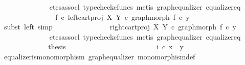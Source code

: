 \begin{isabellebody}
\ \ \ \ \ \ \ \ \ \ \ \ \isamarkupfalse%
\ {\isacharparenleft}{\kern0pt}etcs{\isacharunderscore}{\kern0pt}assocl{\isacharcomma}{\kern0pt}\ typecheck{\isacharunderscore}{\kern0pt}cfuncs{\isacharcomma}{\kern0pt}\ metis\ graph{\isacharunderscore}{\kern0pt}equalizer\ equalizer{\isacharunderscore}{\kern0pt}eq{\isacharparenright}{\kern0pt}\isanewline
\ \ \ \ \ \ \ \ \ \ \isamarkupfalse%
\ \isamarkupfalse%
\ {\isachardoublequoteopen}{\isachardot}{\kern0pt}{\isachardot}{\kern0pt}{\isachardot}{\kern0pt}\ {\isacharequal}{\kern0pt}\ f\ {\isasymcirc}\isactrlsub c\ left{\isacharunderscore}{\kern0pt}cart{\isacharunderscore}{\kern0pt}proj\ X\ Y\ {\isasymcirc}\isactrlsub c\ graph{\isacharunderscore}{\kern0pt}morph\ f\ {\isasymcirc}\isactrlsub c\ y{\isacharprime}{\kern0pt}{\isachardoublequoteclose}\isanewline
\ \ \ \ \ \ \ \ \ \ \ \ \isamarkupfalse%
\ {\isacharparenleft}{\kern0pt}subst\ left{\isacharcomma}{\kern0pt}\ simp{\isacharparenright}{\kern0pt}\isanewline
\ \ \ \ \ \ \ \ \ \ \isamarkupfalse%
\ \isamarkupfalse%
\ {\isachardoublequoteopen}{\isachardot}{\kern0pt}{\isachardot}{\kern0pt}{\isachardot}{\kern0pt}\ {\isacharequal}{\kern0pt}\ right{\isacharunderscore}{\kern0pt}cart{\isacharunderscore}{\kern0pt}proj\ X\ Y\ {\isasymcirc}\isactrlsub c\ graph{\isacharunderscore}{\kern0pt}morph\ f\ {\isasymcirc}\isactrlsub c\ y{\isacharprime}{\kern0pt}{\isachardoublequoteclose}\isanewline
\ \ \ \ \ \ \ \ \ \ \ \ \isamarkupfalse%
\ {\isacharparenleft}{\kern0pt}etcs{\isacharunderscore}{\kern0pt}assocl{\isacharcomma}{\kern0pt}\ typecheck{\isacharunderscore}{\kern0pt}cfuncs{\isacharcomma}{\kern0pt}\ metis\ graph{\isacharunderscore}{\kern0pt}equalizer\ equalizer{\isacharunderscore}{\kern0pt}eq{\isacharparenright}{\kern0pt}\isanewline
\ \ \ \ \ \ \ \ \ \ \isamarkupfalse%
\ \isamarkupfalse%
\ {\isacharquery}{\kern0pt}thesis\isacommand{{\isachardot}{\kern0pt}}\isamarkupfalse%
\isanewline
\ \ \ \ \ \ \ \ \isamarkupfalse%
\isanewline
\ \ \ \ \ \ \isamarkupfalse%
\isanewline
\ \ \ \ \ \ \isamarkupfalse%
\ \isamarkupfalse%
\ {\isachardoublequoteopen}i\ {\isasymcirc}\isactrlsub c\ x{\isacharprime}{\kern0pt}\ {\isacharequal}{\kern0pt}\ y{\isacharprime}{\kern0pt}{\isachardoublequoteclose}\isanewline
\ \ \ \ \ \ \ \ \isamarkupfalse%
\ equalizer{\isacharunderscore}{\kern0pt}is{\isacharunderscore}{\kern0pt}monomorphism\ graph{\isacharunderscore}{\kern0pt}equalizer\ monomorphism{\isacharunderscore}{\kern0pt}def{}\ \isamarkupfalse%

\end{isabellebody}
